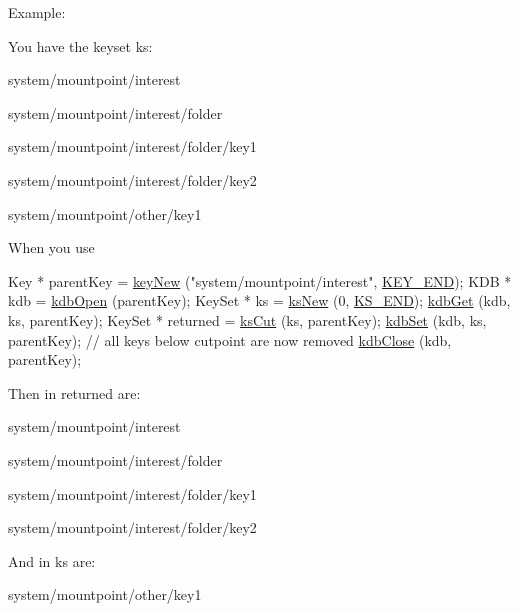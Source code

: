 \begin{DoxyParagraph}{Example\+:}

\end{DoxyParagraph}
You have the keyset {\ttfamily ks\+:} 
\begin{DoxyItemize}
\item {\ttfamily system/mountpoint/interest} 
\item {\ttfamily system/mountpoint/interest/folder} 
\item {\ttfamily system/mountpoint/interest/folder/key1} 
\item {\ttfamily system/mountpoint/interest/folder/key2} 
\item {\ttfamily system/mountpoint/other/key1} 
\end{DoxyItemize}

When you use 
\begin{DoxyCodeInclude}
        Key * parentKey = \hyperlink{group__key_gad23c65b44bf48d773759e1f9a4d43b89}{keyNew} (\textcolor{stringliteral}{"system/mountpoint/interest"}, \hyperlink{group__key_gga9b703ca49f48b482def322b77d3e6bc8aa8adb6fcb92dec58fb19410eacfdd403}{KEY\_END});
        KDB * kdb = \hyperlink{group__kdb_ga6808defe5870f328dd17910aacbdc6ca}{kdbOpen} (parentKey);
        KeySet * ks = \hyperlink{group__keyset_ga671e1aaee3ae9dc13b4834a4ddbd2c3c}{ksNew} (0, \hyperlink{group__keyset_ga7a28fce3773b2c873c94ac80b8b4cd54}{KS\_END});
        \hyperlink{group__kdb_ga28e385fd9cb7ccfe0b2f1ed2f62453a1}{kdbGet} (kdb, ks, parentKey);
        KeySet * returned = \hyperlink{group__keyset_ga6b00cf82b59af4d883a9bad6cf4a4a4a}{ksCut} (ks, parentKey);
        \hyperlink{group__kdb_ga11436b058408f83d303ca5e996832bcf}{kdbSet} (kdb, ks, parentKey); \textcolor{comment}{// all keys below cutpoint are now removed}
        \hyperlink{group__kdb_gadb54dc9fda17ee07deb9444df745c96f}{kdbClose} (kdb, parentKey);
\end{DoxyCodeInclude}
 Then in {\ttfamily returned} are\+:
\begin{DoxyItemize}
\item {\ttfamily system/mountpoint/interest} 
\item {\ttfamily system/mountpoint/interest/folder} 
\item {\ttfamily system/mountpoint/interest/folder/key1} 
\item {\ttfamily system/mountpoint/interest/folder/key2} 
\end{DoxyItemize}

And in {\ttfamily ks} are\+:
\begin{DoxyItemize}
\item {\ttfamily system/mountpoint/other/key1} 
\end{DoxyItemize}

